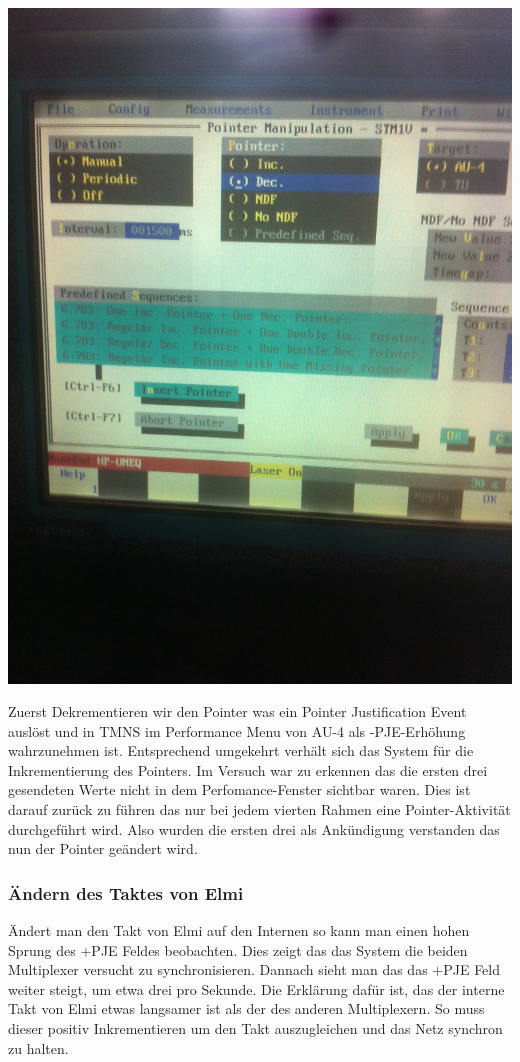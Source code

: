 \includegraphics[scale=1]{sdh/IMG_1937.JPG} 

Zuerst Dekrementieren wir den Pointer was ein Pointer Justification Event auslöst und in TMNS im Performance Menu von AU-4 als -PJE-Erhöhung wahrzunehmen ist.
Entsprechend umgekehrt verhält sich das System für die Inkrementierung des Pointers. Im Versuch war zu erkennen das die ersten drei gesendeten Werte nicht in dem Perfomance-Fenster sichtbar waren. Dies ist darauf zurück zu führen das nur bei jedem vierten Rahmen eine Pointer-Aktivität durchgeführt wird. Also wurden die ersten drei als Ankündigung verstanden das nun der Pointer geändert wird. 

\subsubsection{Ändern des Taktes von Elmi}
Ändert man den Takt von Elmi auf den Internen so kann man einen hohen Sprung des +PJE Feldes beobachten. Dies zeigt das das System die beiden Multiplexer versucht zu synchronisieren. Dannach sieht man das das +PJE Feld weiter steigt, um etwa drei pro Sekunde. Die Erklärung dafür ist, das der interne Takt von Elmi etwas langsamer ist als der des anderen Multiplexern. So muss dieser positiv Inkrementieren um den Takt auszugleichen und das Netz synchron zu halten.

